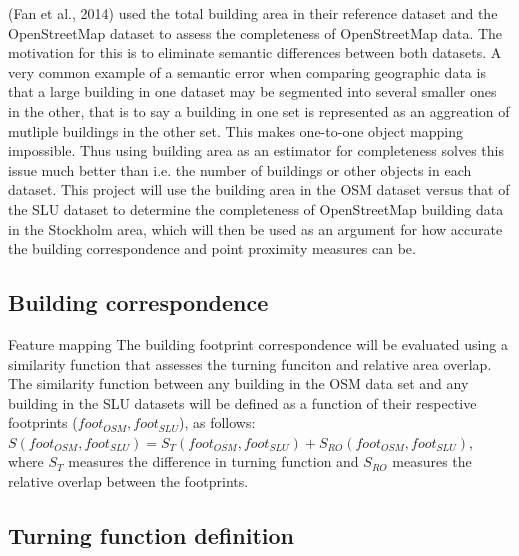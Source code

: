 \documentclass[a4paper]{article}
\begin{document}
(Fan et al., 2014) used the total building area in their reference dataset and the OpenStreetMap dataset to assess the completeness of OpenStreetMap data. The motivation for this is to eliminate semantic differences between both datasets. A very common example of a semantic error when comparing geographic data is that a large building in one dataset may be segmented into several smaller ones in the other, that is to say a building in one set is represented as an aggreation of mutliple buildings in the other set. This makes one-to-one object mapping impossible. Thus using building area as an estimator for completeness solves this issue much better than i.e. the number of buildings or other objects in each dataset.
This project will use the building area in the OSM dataset versus that of the SLU dataset to determine the completeness of OpenStreetMap building data in the Stockholm area, which will then be used as an argument for how accurate the building correspondence and point proximity measures can be.


\subsection{Building correspondence}

Feature mapping
The building footprint correspondence will be evaluated using a similarity function that assesses the turning funciton and relative area overlap. The similarity function between any building in the OSM data set and any building in the SLU datasets will be defined as a function of their respective footprints ($foot_{OSM}, foot_{SLU}$), as follows:
$S(foot_{OSM}, foot_{SLU}) = S_{T}(foot_{OSM}, foot_{SLU}) + S_{RO}(foot_{OSM}, foot_{SLU})$, where $S_{T}$ measures the difference in turning function and $S_{RO}$ measures the relative overlap between the footprints.

\subsection{Turning function definition}

\end{document}
